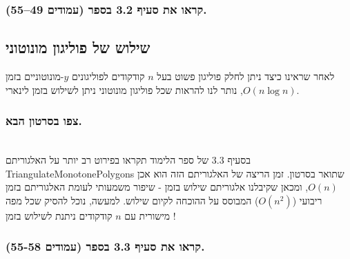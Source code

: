 \documentclass[
]{book}
\begin{document}
\hypertarget{ux5e7ux5e8ux5d0ux5d5-ux5d0ux5ea-ux5e1ux5e2ux5d9ux5e3-3.2-ux5d1ux5e1ux5e4ux5e8-ux5e2ux5deux5d5ux5d3ux5d9ux5dd-4955.}{%
\subsubsection*{קראו את סעיף 3.2 בספר (עמודים 49--55).}\label{ux5e7ux5e8ux5d0ux5d5-ux5d0ux5ea-ux5e1ux5e2ux5d9ux5e3-3.2-ux5d1ux5e1ux5e4ux5e8-ux5e2ux5deux5d5ux5d3ux5d9ux5dd-4955.}}

\hypertarget{ux5e9ux5d9ux5dcux5d5ux5e9-ux5e9ux5dc-ux5e4ux5d5ux5dcux5d9ux5d2ux5d5ux5df-ux5deux5d5ux5e0ux5d5ux5d8ux5d5ux5e0ux5d9}{%
\subsection{שילוש של פוליגון מונוטוני}\label{ux5e9ux5d9ux5dcux5d5ux5e9-ux5e9ux5dc-ux5e4ux5d5ux5dcux5d9ux5d2ux5d5ux5df-ux5deux5d5ux5e0ux5d5ux5d8ux5d5ux5e0ux5d9}}

לאחר שראינו כיצד ניתן לחלק פוליגון פשוט בעל \(n\) קודקודים לפוליגונים \(y\)-מונוטוניים בזמן \(O(n \log n)\), נותר לנו להראות שכל פוליגון מונוטוני ניתן לשילוש בזמן לינארי.

\hypertarget{ux5e6ux5e4ux5d5-ux5d1ux5e1ux5e8ux5d8ux5d5ux5df-ux5d4ux5d1ux5d0.-4}{%
\subsubsection*{צפו בסרטון הבא.}\label{ux5e6ux5e4ux5d5-ux5d1ux5e1ux5e8ux5d8ux5d5ux5df-ux5d4ux5d1ux5d0.-4}}

~\\
בסעיף 3.3 של ספר הלימוד תקראו בפירוט רב יותר על האלגוריתם TriangulateMonotonePolygons שתואר בסרטון. זמן הריצה של האלגוריתם הזה הוא אכן \(O(n)\), ומכאן שקיבלנו אלגוריתם שילוש בזמן - שיפור משמעותי לעומת האלגוריתם בזמן ריבועי (\(O(n^2)\)) המבוסס על ההוכחה לקיום שילוש. למעשה, נוכל להסיק שכל מפה מישורית עם \(n\) קודקודים ניתנת לשילוש בזמן !

\hypertarget{ux5e7ux5e8ux5d0ux5d5-ux5d0ux5ea-ux5e1ux5e2ux5d9ux5e3-3.3-ux5d1ux5e1ux5e4ux5e8-ux5e2ux5deux5d5ux5d3ux5d9ux5dd-55-58.}{%
\subsubsection*{קראו את סעיף 3.3 בספר (עמודים 55-58).}\label{ux5e7ux5e8ux5d0ux5d5-ux5d0ux5ea-ux5e1ux5e2ux5d9ux5e3-3.3-ux5d1ux5e1ux5e4ux5e8-ux5e2ux5deux5d5ux5d3ux5d9ux5dd-55-58.}}
\end{document}

